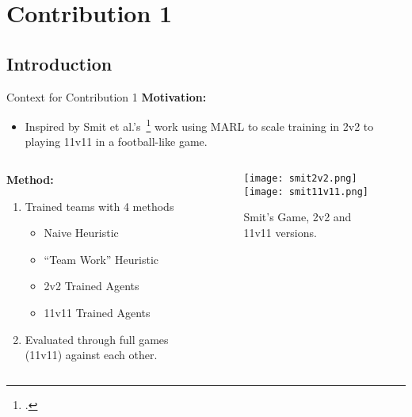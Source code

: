\section{Contribution 1}


\subsection{Introduction}

\begin{frame}{Context for Contribution 1}
    \textbf{Motivation:}
    \begin{itemize}
        \item Inspired by Smit et al.'s~\footcite{smit2023} 
        work using MARL to scale training in 2v2 to playing 11v11 in a football-like game.
    \end{itemize}
    \begin{columns}
        \begin{column}{0.5\textwidth}
            \textbf{Method:}
            \begin{enumerate}
                \item Trained teams with 4 methods
                \begin{itemize}
                    \item Naive Heuristic
                    \item ``Team Work'' Heuristic
                    \item 2v2 Trained Agents
                    \item 11v11 Trained Agents
                \end{itemize}
                \item Evaluated through full games (11v11) against each other.
            \end{enumerate}
        \end{column}
        \begin{column}{0.5\textwidth}
            \begin{figure}
                \centering
                \texttt{[image: smit2v2.png]}
                \texttt{[image: smit11v11.png]}
                \caption{Smit's Game, 2v2 and 11v11 versions.}
                \label{table:smit_envs}
            \end{figure}
        \end{column}
    \end{columns}
\end{frame}

